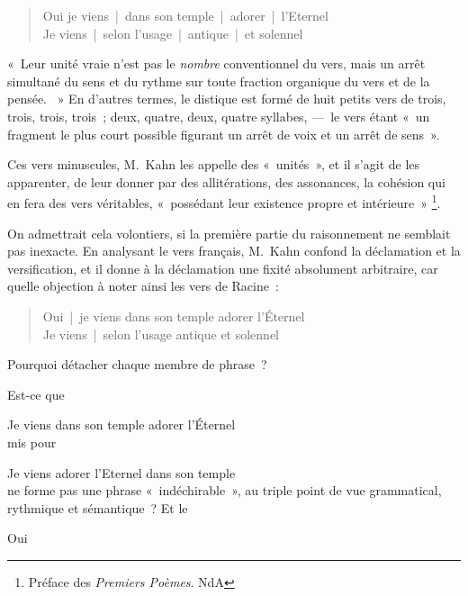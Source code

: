 \documentclass[french,twoside]{book} %
\begin{document}
\begin{verse}
Oui je viens | dans son temple | adorer | l’Eternel\\
Je viens | selon l’usage | antique | et solennel\\
\end{verse}

\noindent « Leur unité vraie n’est pas le {\itshape nombre} conventionnel du vers, mais un arrêt simultané du sens et du rythme sur toute fraction organique du vers et de la pensée.  » En d’autres termes, le distique est formé de huit petits vers de trois, trois, trois, trois ; deux, quatre, deux, quatre syllabes, — le vers étant « un fragment le plus court possible figurant un arrêt de voix et un arrêt de sens ».\par
Ces vers minuscules, M. Kahn les appelle des « unités », et il s’agit de les apparenter, de leur donner par des allitérations, des assonances, la cohésion qui en fera des vers véritables, « possédant leur existence propre et intérieure » \footnote{Préface des {\itshape Premiers Poèmes}. NdA}.\par
On admettrait cela volontiers, si la première partie du raisonnement ne semblait pas inexacte. En analysant le vers français, M. Kahn confond la déclamation et la versification, et il donne à la déclamation une fixité absolument arbitraire, car quelle objection à noter ainsi les vers de Racine :\par


\begin{verse}
Oui | je viens dans son temple adorer l’Éternel\\
Je viens | selon l’usage antique et solennel\\
\end{verse}

\noindent Pourquoi détacher chaque membre de phrase ?\par
Est-ce que\par

Je viens dans son temple adorer l’Éternel\\

\noindent mis pour\par

Je viens adorer l’Eternel dans son temple\\

\noindent ne forme pas une phrase « indéchirable », au triple point de vue grammatical, rythmique et sémantique ? Et le\par

Oui\\
\end{document}
